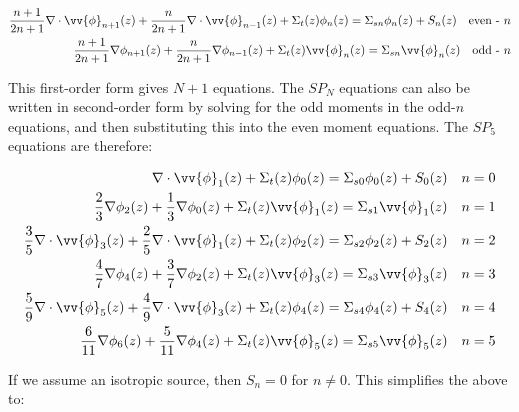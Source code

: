\documentclass[10pt]{article}
\begin{document}
\begin{equation}
\label{eq:SPNEquations}
\begin{aligned}
\frac{n+1}{2n+1}\nabla\cdot\vv{\phi}_{n+1}(z)+\frac{n}{2n+1}\nabla\cdot\vv{\phi}_{n-1}(z)+ \Sigma_t(z)\phi_n(z)=\Sigma_{sn}\phi_n(z)+ S_n(z)\quad \textrm{even - } n\\
\frac{n+1}{2n+1}\nabla\phi_{n+1}(z)+\frac{n}{2n+1}\nabla\phi_{n-1}(z)+ \Sigma_t(z)\vv{\phi}_n(z)=\Sigma_{sn}\vv{\phi}_n(z)\quad \textrm{odd - } n\\
\end{aligned}
 \end{equation}

This first-order form gives \(N+1\) equations. The \(SP_N\) equations can also be written in second-order form by solving for the odd moments in the odd-\(n\) equations, and then substituting this into the even moment equations. The \(SP_5\) equations are therefore:

\begin{equation}
\begin{aligned}
\nabla\cdot\vv{\phi}_{1}(z)+ \Sigma_t(z)\phi_0(z)=\Sigma_{s0}\phi_0(z)+ S_0(z)\quad n=0\\
\frac{2}{3}\nabla\phi_{2}(z)+\frac{1}{3}\nabla\phi_{0}(z)+ \Sigma_t(z)\vv{\phi}_1(z)=\Sigma_{s1}\vv{\phi}_1(z)\quad n=1\\
\frac{3}{5}\nabla\cdot\vv{\phi}_{3}(z)+\frac{2}{5}\nabla\cdot\vv{\phi}_{1}(z)+ \Sigma_t(z)\phi_2(z)=\Sigma_{s2}\phi_2(z)+ S_2(z)\quad n=2\\
\frac{4}{7}\nabla\phi_{4}(z)+\frac{3}{7}\nabla\phi_{2}(z)+ \Sigma_t(z)\vv{\phi}_3(z)=\Sigma_{s3}\vv{\phi}_3(z)\quad n=3\\
\frac{5}{9}\nabla\cdot\vv{\phi}_{5}(z)+\frac{4}{9}\nabla\cdot\vv{\phi}_{3}(z)+ \Sigma_t(z)\phi_4(z)=\Sigma_{s4}\phi_4(z)+ S_4(z)\quad n=4\\
\frac{6}{11}\nabla\phi_{6}(z)+\frac{5}{11}\nabla\phi_{4}(z)+ \Sigma_t(z)\vv{\phi}_5(z)=\Sigma_{s5}\vv{\phi}_5(z)\quad n=5\\
\end{aligned}
\end{equation}

If we assume an isotropic source, then \(S_n=0\) for \(n\neq0\). This simplifies the above to:
\end{document}
